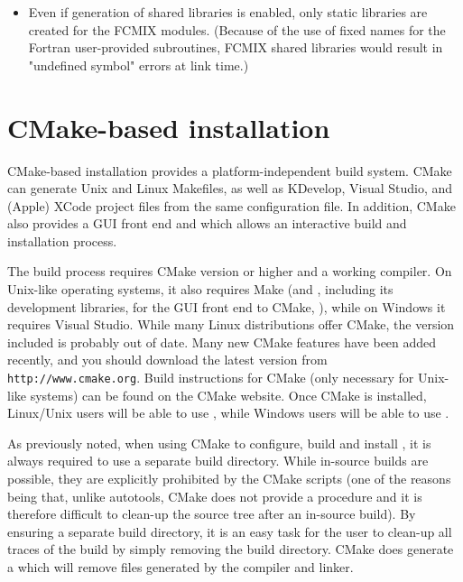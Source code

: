 \begin{itemize}
\item Even if generation of shared libraries is enabled, only static libraries
  are created for the FCMIX modules.  (Because of the use of fixed names for
  the Fortran user-provided subroutines, FCMIX shared libraries would result in
  "undefined symbol" errors at link time.)

\end{itemize}


\section{CMake-based installation}\label{s:cmake_inst}

CMake-based installation provides a platform-independent build system. CMake can generate
Unix and Linux Makefiles, as well as KDevelop, Visual Studio, and 
(Apple) XCode project files from the same configuration file.
In addition, CMake also provides a GUI front end and which allows an interactive build and
installation process.

The {\sundials} build process requires CMake version  or
higher and a working {\CC} compiler.  On Unix-like operating systems, it
also requires Make (and , including its development libraries,
for the GUI front end to CMake, ), while on Windows it
requires Visual Studio.  While many Linux distributions offer CMake,
the version included is probably out of date.  Many new CMake
features have been added recently, and you should download the latest
version from {\tt http://www.cmake.org}.  Build instructions for CMake
(only necessary for Unix-like systems) can be found on the CMake website.
Once CMake is installed, Linux/Unix users will be able to use ,
while Windows users will be able to use .

As previously noted, when using CMake to configure, build and install {\sundials}, it is always
required to use a separate build directory. While in-source builds are possible, they are
explicitly prohibited by the {\sundials} CMake scripts (one of the reasons being that, unlike
autotools, CMake does not provide a  procedure and it is therefore
difficult to clean-up the source tree after an in-source build). By ensuring a separate build
directory, it is an easy task for the user to clean-up all traces of the build by simply removing
the build directory. CMake does generate a  which will remove files generated by the
compiler and linker.

